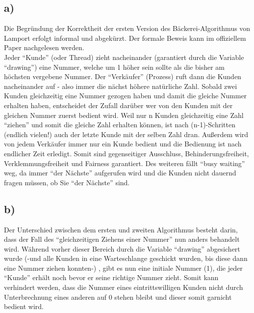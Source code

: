 \documentclass[11pt,a4paper,DIV=10,]{scrartcl}
\begin{document}
\subsection*{a)}
Die Begründung der Korrektheit der ersten Version des Bäckerei-Algorithmus von Lamport erfolgt informal und abgekürzt. Der formale Beweis kann im offiziellem Paper nachgelesen werden.\\
Jeder ``Kunde'' (oder Thread) zieht nacheinander (garantiert durch die Variable ``drawing'') eine Nummer, welche um 1 höher sein sollte als die bisher am höchsten vergebene Nummer. Der ``Verkäufer'' (Prozess) ruft dann die Kunden nacheinander auf - also immer die nächst höhere natürliche Zahl. Sobald zwei Kunden gleichzeitig eine Nummer gezogen haben und damit die gleiche Nummer erhalten haben, entscheidet der Zufall darüber wer von den Kunden mit der gleichen Nummer zuerst bedient wird. 
Weil nur n Kunden gleichzeitig eine Zahl ``ziehen'' und somit die gleiche Zahl erhalten können, ist nach (n-1)-Schritten (endlich vielen!) auch der letzte Kunde mit der selben Zahl dran. Außerdem wird von jedem Verkäufer immer nur ein Kunde bedient und die Bedienung ist nach endlicher Zeit erledigt. Somit sind gegenseitiger Ausschluss, Behinderungsfreiheit, Verklemmungsfreiheit und Fairness garantiert. Des weiteren fällt ``busy waiting'' weg, da immer ``der Nächste'' aufgerufen wird und die Kunden nicht dauernd fragen müssen, ob Sie ``der Nächste'' sind. 
\subsection*{b)}
Der Unterschied zwischen dem ersten und zweiten Algorithmus besteht darin, dass der Fall des ``gleichzeitigen Ziehens einer Nummer'' nun anders behandelt wird. Während vorher dieser Bereich durch die Variable ``drawing'' abgesichert wurde (-und alle Kunden in eine Warteschlange geschickt wurden, bis diese dann eine Nummer ziehen konnten-) , gibt es nun eine initiale Nummer (1), die jeder ``Kunde'' erhält noch bevor er seine richtige Nummer zieht. Somit kann verhindert werden, dass die Nummer eines eintrittswilligen Kunden nicht durch Unterbrechnung eines anderen auf 0 stehen bleibt und dieser somit garnicht bedient wird. 



\end{document}
